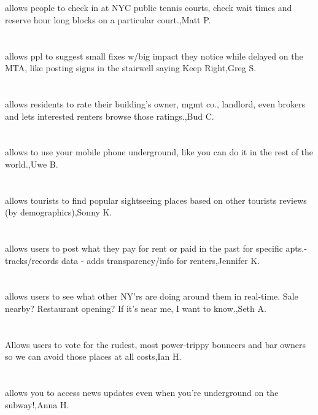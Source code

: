 \section{}allows people to check in at NYC public tennis courts, check wait times and reserve hour long blocks on a particular court.,Matt P.
\section{}allows ppl to suggest small fixes w/big impact they notice while delayed on the MTA, like posting signs in the stairwell saying Keep Right,Greg S.
\section{}allows residents to rate their building's owner, mgmt co., landlord, even brokers and lets interested renters browse those ratings.,Bud C.	
\section{}allows to use your mobile phone underground, like you can do it in the rest of the world.,Uwe B.	
\section{}allows tourists to find popular sightseeing places based on other tourists reviews (by demographics),Sonny K.	
\section{}allows users to post what they pay for rent or paid in the past for specific apts.-tracks/records data - adds transparency/info for renters,Jennifer K.	
\section{}allows users to see what other NY'rs are doing around them in real-time. Sale nearby? Restaurant opening? If it's near me, I want to know.,Seth A.	
\section{}Allows users to vote for the rudest, most power-trippy bouncers and bar owners so we can avoid those places at all costs,Ian H.	
\section{}allows you to access news updates even when you're underground on the subway!,Anna H.	
